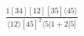 \documentclass[varwidth, border=5pt]{standalone}
\begin{document}
\begin{my}
$\begin{gathered}
\scriptscriptstyle\frac{1[34][12][35]⟨45⟩}{⟨12⟩[45]^2⟨5|1+2|5]}
\end{gathered}$
\end{my}
\end{document}
